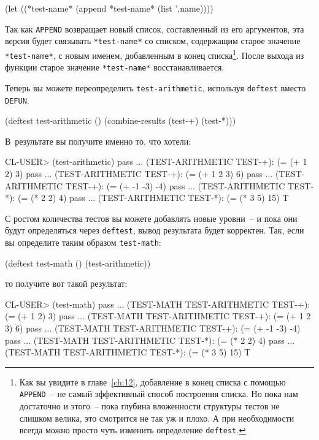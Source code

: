 \begin{myverb}
(let ((*test-name* (append *test-name* (list ',name))))
\end{myverb}

Так как \lstinline{APPEND} возвращает новый список, составленный из его аргументов, эта
версия будет связывать \lstinline{*test-name*} со списком, содержащим старое значение
\lstinline{*test-name*}, с новым именем, добавленным в конец списка\footnote{Как вы
  увидите в главе~\ref{ch:12}, добавление в конец списка с помощью \lstinline{APPEND}~--
  не самый эффективный способ построения списка. Но пока нам достаточно и этого~-- пока
  глубина вложенности структуры тестов не слишком велика, это смотрится не так уж и
  плохо. А при необходимости всегда можно просто чуть изменить определение
  \lstinline{deftest}.}\hspace{\footnotenegspace}. После выхода из функции старое значение \lstinline{*test-name*}
восстанавливается.

Теперь вы можете переопределить \lstinline{test-arithmetic}, используя \lstinline{deftest} вместо
\lstinline{DEFUN}.

\begin{myverb}
(deftest test-arithmetic ()
  (combine-results
   (test-+)
   (test-*)))
\end{myverb}

В~результате вы получите именно то, что хотели:

\begin{myverb}
CL-USER> (test-arithmetic)
pass ... (TEST-ARITHMETIC TEST-+): (= (+ 1 2) 3)
pass ... (TEST-ARITHMETIC TEST-+): (= (+ 1 2 3) 6)
pass ... (TEST-ARITHMETIC TEST-+): (= (+ -1 -3) -4)
pass ... (TEST-ARITHMETIC TEST-*): (= (* 2 2) 4)
pass ... (TEST-ARITHMETIC TEST-*): (= (* 3 5) 15)
T
\end{myverb}

С ростом количества тестов вы можете добавлять новые уровни~-- и пока они будут
определяться через \lstinline{deftest}, вывод результата будет корректен. Так, если вы
определите таким образом \lstinline{test-math}:

\begin{myverb}
(deftest test-math ()
  (test-arithmetic))
\end{myverb}

то получите вот такой результат:

\begin{myverb}
CL-USER> (test-math)
pass ... (TEST-MATH TEST-ARITHMETIC TEST-+): (= (+ 1 2) 3)
pass ... (TEST-MATH TEST-ARITHMETIC TEST-+): (= (+ 1 2 3) 6)
pass ... (TEST-MATH TEST-ARITHMETIC TEST-+): (= (+ -1 -3) -4)
pass ... (TEST-MATH TEST-ARITHMETIC TEST-*): (= (* 2 2) 4)
pass ... (TEST-MATH TEST-ARITHMETIC TEST-*): (= (* 3 5) 15)
T
\end{myverb}

